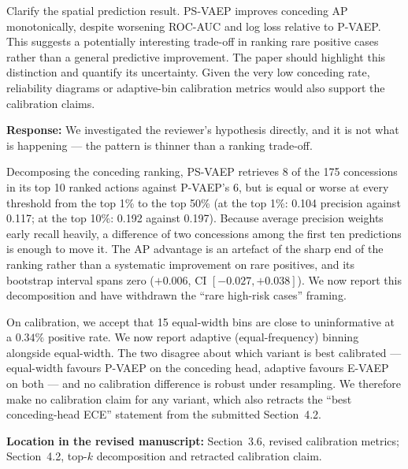 \documentclass[11pt,a4paper]{article}
\newcommand{\response}[2]{%
  \begin{responsebox}
  \textbf{Response:}
  #1
  \end{responsebox}
  \begin{locationbox}
  \textbf{Location in the revised manuscript:}
  #2
  \end{locationbox}
}
\begin{document}
\begin{reviewbox}
Clarify the spatial prediction result. PS-VAEP improves conceding AP monotonically, despite worsening ROC-AUC and log loss relative to P-VAEP. This suggests a potentially interesting trade-off in ranking rare positive cases rather than a general predictive improvement. The paper should highlight this distinction and quantify its uncertainty. Given the very low conceding rate, reliability diagrams or adaptive-bin calibration metrics would also support the calibration claims.
\end{reviewbox}
\response{We investigated the reviewer's hypothesis directly, and it is not what is happening --- the pattern is thinner than a ranking trade-off.

Decomposing the conceding ranking, PS-VAEP retrieves 8 of the 175 concessions in its top 10 ranked actions against P-VAEP's 6, but is equal or worse at every threshold from the top 1\% to the top 50\% (at the top 1\%: 0.104 precision against 0.117; at the top 10\%: 0.192 against 0.197). Because average precision weights early recall heavily, a difference of two concessions among the first ten predictions is enough to move it. The AP advantage is an artefact of the sharp end of the ranking rather than a systematic improvement on rare positives, and its bootstrap interval spans zero ($+0.006$, CI $[-0.027, +0.038]$). We now report this decomposition and have withdrawn the ``rare high-risk cases'' framing.

On calibration, we accept that 15 equal-width bins are close to uninformative at a $0.34\%$ positive rate. We now report adaptive (equal-frequency) binning alongside equal-width. The two disagree about which variant is best calibrated --- equal-width favours P-VAEP on the conceding head, adaptive favours E-VAEP on both --- and no calibration difference is robust under resampling. We therefore make no calibration claim for any variant, which also retracts the ``best conceding-head ECE'' statement from the submitted Section~4.2.}{Section~3.6, revised calibration metrics; Section~4.2, top-$k$ decomposition and retracted calibration claim.}
\end{document}
